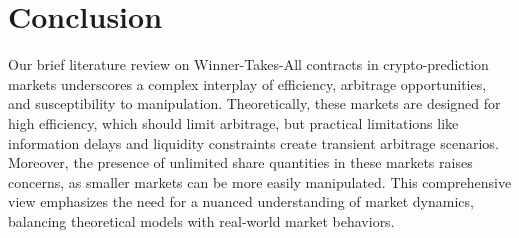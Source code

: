 \section{Conclusion}
\label{sec:conclusion}

Our brief literature review on Winner-Takes-All contracts in crypto-prediction markets underscores a complex interplay of efficiency, arbitrage opportunities, and susceptibility to manipulation. Theoretically, these markets are designed for high efficiency, which should limit arbitrage, but practical limitations like information delays and liquidity constraints create transient arbitrage scenarios. Moreover, the presence of unlimited share quantities in these markets raises concerns, as smaller markets can be more easily manipulated. This comprehensive view emphasizes the need for a nuanced understanding of market dynamics, balancing theoretical models with real-world market behaviors.
